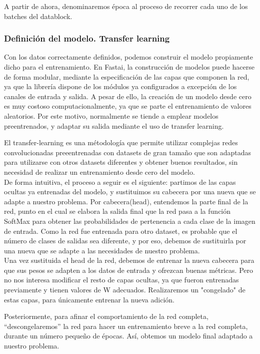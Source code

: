 A partir de ahora, denominaremos época al proceso de recorrer cada uno de los batches del datablock.

\subsubsection{Definición del modelo. Transfer learning}

Con los datos correctamente definidos, podemos construir el modelo propiamente dicho para el entrenamiento. En Fastai, la construcción de modelos puede hacerse de forma modular, mediante la especificación de las capas que componen la red, ya que la librería dispone de los módulos ya configurados a excepción de los canales de entrada y salida. A pesar de ello, la creación de un modelo desde cero es muy costoso computacionalmente, ya que se parte el entrenamiento de valores aleatorios. Por este motivo, normalmente se tiende a emplear modelos preentrenados, y adaptar su salida mediante el uso de transfer learning.

El transfer-learning es una métodología que permite utilizar complejas redes convolucionadas preeentrenadas con datasets de gran tamaño que son adaptadas para utilizarse con otros datasets diferentes y obtener buenos resultados, sin necesidad de realizar un entrenamiento desde cero del modelo.\\

De forma intuitiva, el proceso a seguir es el siguiente: partimos de las capas ocultas ya entrenadas del modelo, y sustituimos su cabecera por una nueva que se adapte a nuestro problema. Por cabecera(head), entendemos la parte final de la red, punto en el cual se elabora la salida final que la red pasa a la función SoftMax para obtener las probabilidades de pertenencia a cada clase de la imagen de entrada. Como la red fue entrenada para otro dataset, es probable que el número de clases de salidas sea diferente, y por eso, debemos de sustituirla por una nueva que se adapte a las necesidades de nuestro problema.\\

Una vez sustituida el head de la red, debemos de entrenar la nueva cabecera para que sus pesos se adapten a los datos de entrada y ofrezcan buenas métricas. Pero no nos interesa modificar el resto de capas ocultas, ya que fueron entrenadas previamente y tienen valores de W adecuados. Realizaremos un "congelado" de estas capas, para únicamente entrenar la nueva adición.

Posteriormente, para afinar el comportamiento de la red completa, ``descongelaremos'' la red para hacer un entrenamiento breve a la red completa, durante un número pequeño de épocas. Así, obtemos un modelo final adaptado a nuestro problema.\\

